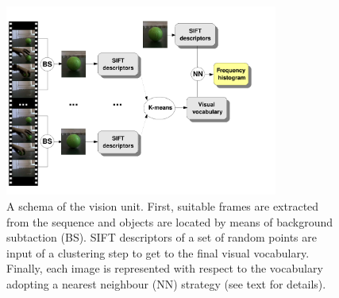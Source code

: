 \begin{figure}
	\centering
	\includegraphics[width=0.8\textwidth]{images_pdf/images/schema_vision}
	\caption{A schema of the vision unit. First, suitable frames are extracted from the sequence and objects are located by means of background subtaction (BS). SIFT descriptors of a set of random points are input of a clustering step to get to the final visual vocabulary. Finally, each image is represented with respect to the vocabulary adopting a nearest neighbour (NN) strategy (see text for details).}
	\label{fig::vision}
\end{figure}

